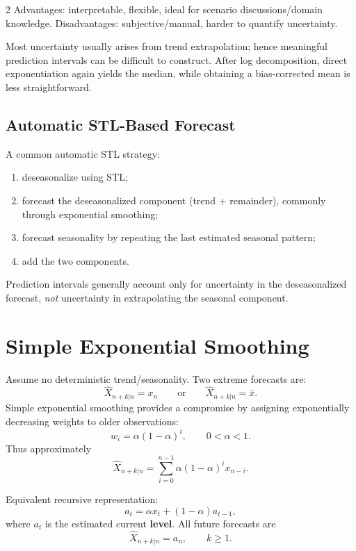 \documentclass[9pt,a4paper]{extarticle}
\newcommand{\key}[1]{\textbf{#1}}
\begin{document}
\begin{multicols}{2}
Advantages: interpretable, flexible, ideal for scenario discussions/domain knowledge. Disadvantages: subjective/manual, harder to quantify uncertainty.

Most uncertainty usually arises from trend extrapolation; hence meaningful prediction intervals can be difficult to construct. After log decomposition, direct exponentiation again yields the median, while obtaining a bias-corrected mean is less straightforward.

\subsection{Automatic STL-Based Forecast}

A common automatic STL strategy:
\begin{enumerate}
\item deseasonalize using STL;
\item forecast the deseasonalized component (trend + remainder), commonly through exponential smoothing;
\item forecast seasonality by repeating the last estimated seasonal pattern;
\item add the two components.
\end{enumerate}

Prediction intervals generally account only for uncertainty in the deseasonalized forecast, \emph{not} uncertainty in extrapolating the seasonal component.

\section{Simple Exponential Smoothing}

Assume no deterministic trend/seasonality. Two extreme forecasts are:
\[
\widehat X_{n+k|n}=x_n
\qquad\text{or}\qquad
\widehat X_{n+k|n}=\bar x.
\]
Simple exponential smoothing provides a compromise by assigning exponentially decreasing weights to older observations:
\[
\boxed{
w_i=\alpha(1-\alpha)^i,\qquad 0<\alpha<1.
}
\]
Thus approximately
\[
\boxed{
\widehat X_{n+k|n}
=
\sum_{i=0}^{n-1}
\alpha(1-\alpha)^i x_{n-i}.
}
\]

Equivalent recursive representation:
\[
\boxed{
a_t=\alpha x_t+(1-\alpha)a_{t-1},
}
\]
where \(a_t\) is the estimated current \key{level}. All future forecasts are
\[
\boxed{\widehat X_{n+k|n}=a_n,\qquad k\ge1.}
\]


\end{multicols}
\end{document}
